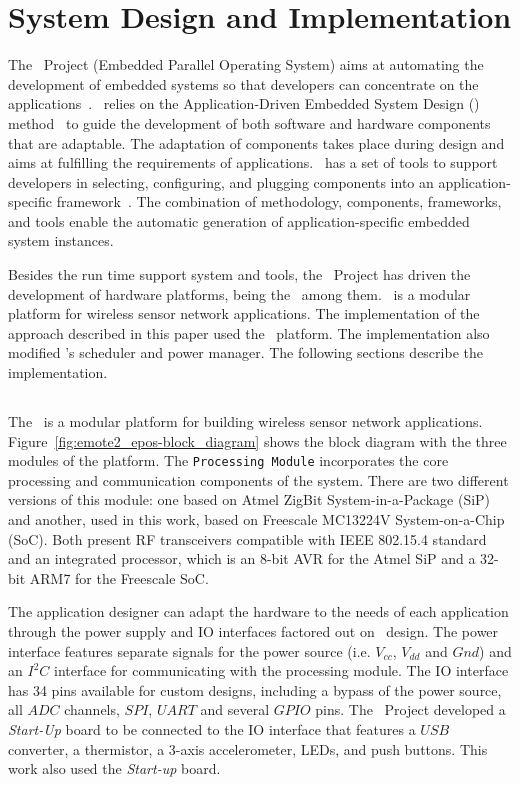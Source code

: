 \section{System Design and Implementation}
\label{sec:design}

The \epos~Project (Embedded Parallel Operating System) aims at automating the development of embedded systems so that developers can concentrate on the applications~\cite{Project:EPOS:2012}.
\epos~relies on the Application-Driven Embedded System Design (\adesd) method~\cite{Frohlich:2001} to guide the development of both software and hardware components that are adaptable.
The adaptation of components takes place during design and aims at fulfilling the requirements of applications.
\epos~has a set of tools to support developers in selecting, configuring, and plugging components into an application-specific framework~\cite{Schulter:JOT:2007}.
The combination of methodology, components, frameworks, and tools enable the automatic generation of application-specific embedded system instances.

Besides the run time support system and tools, the \epos~Project has driven the development of hardware platforms, being the \emote~among them.
\emote~is a modular platform for wireless sensor network applications.
The implementation of the approach described in this paper used the \emote~platform.
The implementation also modified \epos's scheduler and power manager.
The following sections describe the implementation.

\subsection{\emote}
\label{sec:emote}

The \emote~is a modular platform for building wireless sensor network applications.
Figure~\ref{fig:emote2_epos-block_diagram} shows the block diagram with the three modules of the platform.
The \texttt{Processing Module} incorporates the core processing and communication components of the system.
There are two different versions of this module: one based on Atmel ZigBit System-in-a-Package (SiP) and another, used in this work, based on Freescale MC13224V System-on-a-Chip (SoC).
Both present RF transceivers compatible with IEEE 802.15.4 standard~\cite{IEEE802154:2006} and an integrated processor, which is an 8-bit AVR for the Atmel SiP and a 32-bit ARM7 for the Freescale SoC.

The application designer can adapt the hardware to the needs of each application through the power supply and IO interfaces factored out on \emote~design.
The power interface features separate signals for the power source (i.e. $V_{cc}$, $V_{dd}$ and $Gnd$) and an $I^2C$ interface for communicating with the processing module.
The IO interface has 34 pins available for custom designs, including a bypass of the power source, all $ADC$ channels, $SPI$, $UART$ and several $GPIO$ pins.
The \emote~Project developed a \emph{Start-Up} board to be connected to the IO interface that features a $USB$ converter, a thermistor, a 3-axis accelerometer, LEDs, and push buttons.
This work also used the \emph{Start-up} board.  


